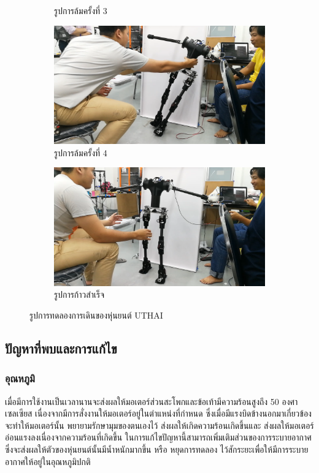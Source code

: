 \begin{figure}[!ht]
\begin{subfigure}[b]{0.4\linewidth}
      \caption{รูปการล้มครั้งที่ 3}
    \end{subfigure}
    \begin{subfigure}[b]{0.4\linewidth}
      \includegraphics[width=\linewidth]{chapter4/images/fall4.png}
      \caption{รูปการล้มครั้งที่ 4}
    \end{subfigure}
    \begin{subfigure}[b]{0.4\linewidth}
      \includegraphics[width=\linewidth]{chapter4/images/achive1.png}
      \caption{รูปการก้าวสำเร็จ}
    \end{subfigure}
    \caption{รูปการทดลองการเดินของหุ่นยนต์ UTHAI}
    \label{fig:test_result}
  \end{figure}


\clearpage
\subsection{ปัญหาที่พบและการแก้ไข}
\subsubsection{อุณหภูมิ}
เมื่อมีการใช้งานเป็นเวลานานจะส่งผลให้มอเตอร์ส่วนสะโพกและข้อเท้ามีความร้อนสูงถึง 50 องศาเซลเซียส 
เนื่องจากมีการสั่งงานให้มอเตอร์อยู่ในตำแหน่งที่กำหนด ซึ่งเมื่อมีแรงบิดข้างนอกมาเกี่ยวข้อง จะทำให้มอเตอร์นั้น
พยายามรักษามุมของตนเองไว้ ส่งผลให้เกิดความร้อนเกิดขึ้นและ ส่งผลให้มอเตอร์อ่อนแรงลงเนื่องจากความร้อนที่เกิดขึ้น 
ในการแก้ไขปัญหานี้สามารถเพิ่มเติมส่วนของการระบายอากาศซึ่งจะส่งผลให้ตัวของหุ่นยนต์นั้นมีน้ำหนักมากขึ้น หรือ หยุดการทดลอง
ไว้สักระยะเพื่อให้มีการระบายอากาศให้อยู่ในอุณหภูมิปกติ
